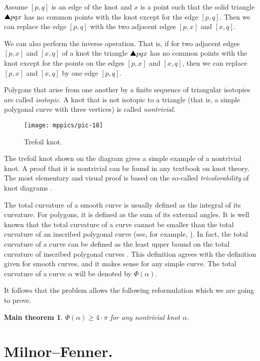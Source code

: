 \documentclass{article}
\theoremstyle{theorem}
\newtheorem*{maintheorem}{Main theorem}
\newtheorem{Crofton-type formula}[theorem]{Crofton-type formula}
\newtheorem{Douglas--Rado theorem}[theorem]{Douglas--Rado theorem}
\newtheorem{Extended monotonicity theorem}[theorem]{Extended monotonicity theorem}
\theoremstyle{definition}
\def\solidtriangle{\text{\ding{115}}}
\def\ge{\geqslant}
\begin{document}
Assume $[p,q]$ is an edge of the knot and $x$
is a point such that the solid triangle $\solidtriangle pqx$  has no common points with the knot except for the edge $[p,q]$.
Then we can replace the edge $[p,q]$ with the two adjacent edges $[p,x]$ and $[x,q]$.

We can also perform the inverse operation.
That is, if for two adjacent edges $[p,x]$ and $[x,q]$ of a knot the triangle
$\solidtriangle pqx$ has no common points with the knot except for the points on the edges $[p,x]$ and $[x,q]$,
then we can replace $[p,x]$ and $[x,q]$ by one edge $[p,q]$.

Polygons that arise from one another by a finite sequence of
triangular isotopies are called \emph{isotopic}.
A knot that is not isotopic to a triangle (that is, a simple polygonal curve with three vertices) is called \emph{nontrivial}.

\begin{figure}[!ht]
\vskip-0mm
\centering
\texttt{[image: mppics/pic-18]}
\vskip0mm
\caption{Trefoil knot.}
\end{figure}

The trefoil knot shown on the diagram gives a simple example of a nontrivial knot.
A proof that it is nontrivial can be found in any textbook on knot theory.
The most elementary and visual proof is based on the so-called \emph{tricolorability} of knot diagrams \cite[Section 1.5]{adams}.

The total curvature of a smooth curve is usually defined as the integral of its curvature.
For polygons, it is defined as the sum of its external angles.
It is well known that the total curvature of a curve cannot be smaller than the total curvature of an inscribed polygonal curve (see, for example, \cite{petrunin-zamora}).
In fact, the total curvature of a curve can be defined as the least upper bound on the total curvature of inscribed polygonal curves \cite{aleksandrov-reshetnyak, sullivan-curves}.
This definition agrees with the definition given for smooth curves, and it makes sense for any simple curve.
The total curvature of a curve $\alpha$ will be denoted by $\Phi(\alpha)$.

It follows that the problem allows the following reformulation which we are going to prove.

\begin{maintheorem}
\textit{$\Phi(\alpha)\ge 4{\cdot}\pi$ for any nontrivial knot $\alpha$.}
\end{maintheorem}

\section{Milnor--Fenner.}
\end{document}
